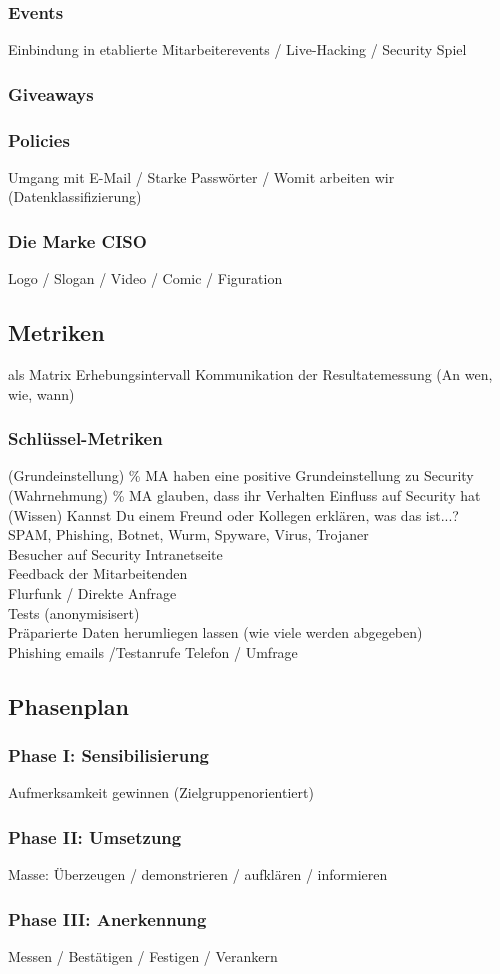 \documentclass[../../main.tex]{subfiles}
\begin{document}
\subsubsection{Events}
    Einbindung in etablierte Mitarbeiterevents / Live-Hacking / Security Spiel
\subsubsection{Giveaways}
\subsubsection{Policies}
    Umgang mit E-Mail / Starke Passwörter / Womit arbeiten wir (Datenklassifizierung)
\subsubsection{Die Marke CISO}
    Logo / Slogan / Video / Comic / Figuration
\subsection{Metriken}
  als Matrix
  Erhebungsintervall
  Kommunikation der Resultatemessung (An wen, wie, wann)
\subsubsection{Schlüssel-Metriken}
    (Grundeinstellung) \% MA haben eine positive Grundeinstellung zu Security\\
    (Wahrnehmung) \% MA glauben, dass ihr Verhalten Einfluss auf Security hat\\
    (Wissen) Kannst Du einem Freund oder Kollegen erklären, was das ist...?\\
    SPAM, Phishing, Botnet, Wurm, Spyware, Virus, Trojaner\\
    Besucher auf Security Intranetseite\\
    Feedback der Mitarbeitenden\\
      Flurfunk / Direkte Anfrage\\
    Tests (anonymisisert)\\
      Präparierte Daten herumliegen lassen (wie viele werden abgegeben)\\
      Phishing emails /Testanrufe Telefon / Umfrage
\subsection{Phasenplan}
\subsubsection{Phase I: Sensibilisierung}
    Aufmerksamkeit gewinnen (Zielgruppenorientiert)
\subsubsection{Phase II: Umsetzung}
    Masse: Überzeugen / demonstrieren / aufklären / informieren
\subsubsection{Phase III: Anerkennung}
    Messen / Bestätigen / Festigen / Verankern
\end{document}
